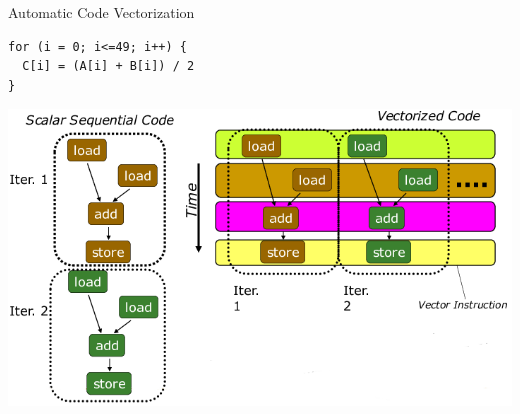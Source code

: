 \documentclass[presentation]{beamer}
\begin{document}
\begin{frame}[label={sec:org5e5ede6},fragile]{Automatic Code Vectorization}
 \begin{block}{}
\lstset{language=C,label= ,caption= ,captionpos=b,numbers=none}
\begin{lstlisting}
for (i = 0; i<=49; i++) {
  C[i] = (A[i] + B[i]) / 2
}
\end{lstlisting}
\end{block}

\begin{block}{}
\begin{center}
\includegraphics[width=.9\linewidth]{./images/slides_SIMD_55_small.png}
\end{center}
\end{block}
\end{frame}
\end{document}
